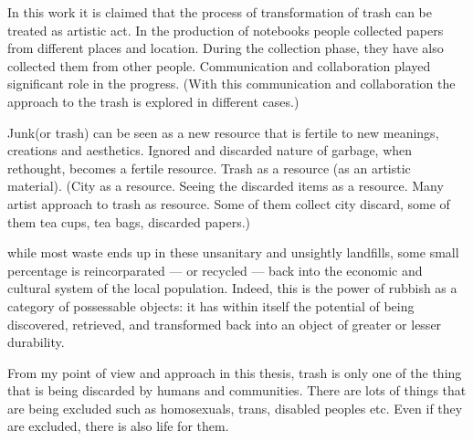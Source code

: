 In this work it is claimed that the process of transformation of trash can be treated as artistic act. In the production of notebooks people collected papers from different places and location. During the collection phase, they have also collected them from other people. Communication and collaboration played significant role in the progress. (With this communication and collaboration the approach to the trash is explored in different cases.)

Junk(or trash) can be seen as a new resource that is fertile to new meanings, creations and aesthetics. Ignored and discarded nature of garbage, when rethought, becomes a fertile resource. Trash as a resource (as an artistic material). (City as a resource. Seeing the discarded items as a resource. Many artist approach to trash as resource. Some of them collect city discard, some of them tea cups, tea bags, discarded papers.)

 while most waste ends up in these unsanitary and unsightly landfills, some small percentage is reincorparated --- or recycled --- back into the economic and cultural system of the local population. Indeed, this is the power of rubbish as a category of possessable objects: it has within itself the potential of being discovered, retrieved, and transformed back into an object of greater or lesser durability. 


From my point of view and approach in this thesis, trash is only one of the thing that is being discarded by humans and communities. There are lots of things that are being excluded such as homosexuals, trans, disabled peoples etc. Even if they are excluded, there is also life for them. 






